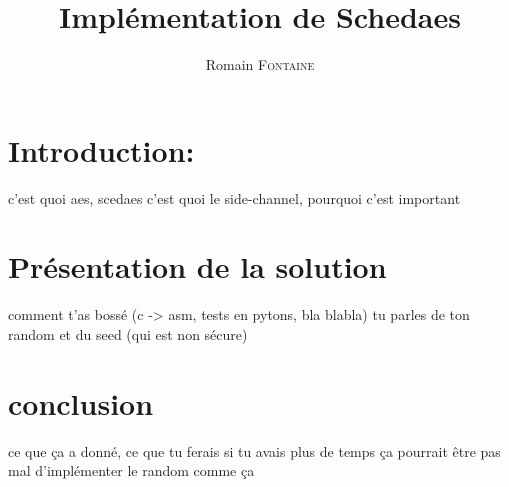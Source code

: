 \documentclass[a4paper,10pt]{article}
\author{Romain \textsc{Fontaine}}
\title{Implémentation de Schedaes}
\begin{document}
\maketitle

\section{Introduction:}
c'est quoi aes, scedaes
c'est quoi le side-channel, pourquoi c'est important

\section{Présentation de la solution}
comment t'as bossé (c -> asm, tests en pytons, bla blabla)
tu parles de ton random et du seed (qui est non sécure)

\section{conclusion}
ce que ça a donné, ce que tu ferais si tu avais plus de temps
ça pourrait être pas mal d'implémenter le random comme ça
\end{document}
